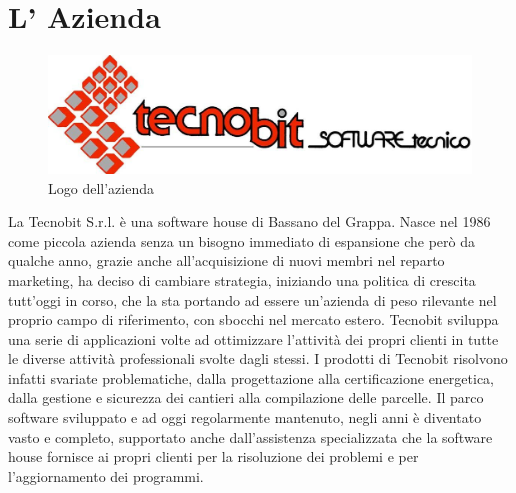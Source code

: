 \section{L' Azienda}

\begin{figure}[!ht]
\centering
 \includegraphics[scale=0.3]{./images/tecnobit.jpg}
\caption{Logo dell'azienda}
\end{figure}

\noindent La Tecnobit S.r.l. \`e una software house di Bassano del Grappa. Nasce nel 1986 come piccola azienda senza un bisogno immediato di espansione che per\`o da qualche anno, grazie anche all'acquisizione di nuovi membri nel reparto marketing, ha deciso di cambiare strategia, iniziando una politica di crescita tutt'oggi in corso, che la sta portando ad essere un'azienda di peso rilevante nel proprio campo di riferimento, con sbocchi nel mercato estero. 
Tecnobit sviluppa una serie di applicazioni volte ad ottimizzare l’attivit\` a dei propri clienti in tutte le diverse attivit\`a professionali svolte dagli stessi. I prodotti di Tecnobit risolvono infatti svariate problematiche, dalla progettazione alla certificazione energetica, dalla gestione e sicurezza dei cantieri alla compilazione delle parcelle. Il parco software sviluppato e ad oggi regolarmente mantenuto, negli anni \` e diventato vasto e completo, supportato anche dall'assistenza specializzata che la software house fornisce ai propri clienti per la risoluzione dei problemi e per l'aggiornamento dei programmi.

